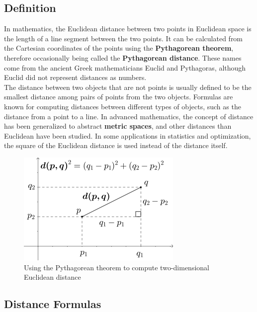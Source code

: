     \subsection{Definition}
        In mathematics, the Euclidean distance between two points in Euclidean space is the length of a line segment between the two points. It can be calculated from the Cartesian coordinates of the points using the 
        \textbf{Pythagorean theorem}, therefore occasionally being called the \textbf{Pythagorean distance}. These names come from the ancient Greek mathematicians Euclid and Pythagoras, although Euclid did not represent distances as numbers. \\ 
        \vspace{3mm}
        The distance between two objects that are not points is usually defined to be the smallest distance among pairs of points from the two objects. Formulas are known for computing distances between different types of objects, such as the 
        distance from a point to a line. In advanced mathematics, the concept of distance has been generalized to abstract \textbf{metric spaces}, and other distances than Euclidean have been studied. In some applications in statistics and optimization, 
        the square of the Euclidean distance is used instead of the distance itself.
        \begin{figure}[H]
            \centering
            \includegraphics[width=0.6\linewidth]{img/pythagorean.png}
            \caption{Using the Pythagorean theorem to compute two-dimensional Euclidean distance}
        \end{figure}
    \subsection{Distance Formulas}
